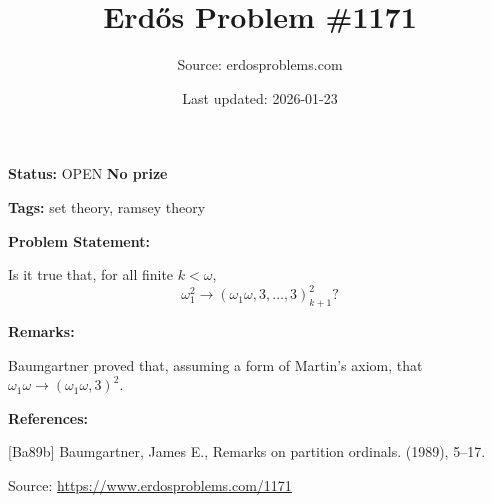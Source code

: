 \documentclass{article}
\title{Erd\H{o}s Problem \#1171}
\date{Last updated: 2026-01-23}
\author{Source: erdosproblems.com}
\begin{document}
\maketitle

\noindent\textbf{Status:} OPEN \quad \textbf{No prize}

\noindent\textbf{Tags:} set theory, ramsey theory

\medskip
\noindent\textbf{Problem Statement:}

Is it true that, for all finite $k<\omega$,\[\omega_1^2\to (\omega_1\omega, 3,\ldots,3)_{k+1}^2?\]

\bigskip
\noindent\textbf{Remarks:}

Baumgartner \cite{Ba89b} proved that, assuming a form of Martin's axiom, that $\omega_1\omega\to (\omega_1\omega, 3)^2$.

\bigskip
\noindent\textbf{References:}

[Ba89b] Baumgartner, James E., Remarks on partition ordinals. (1989), 5--17.

\bigskip
\noindent\small{Source: \url{https://www.erdosproblems.com/1171}}
\end{document}
